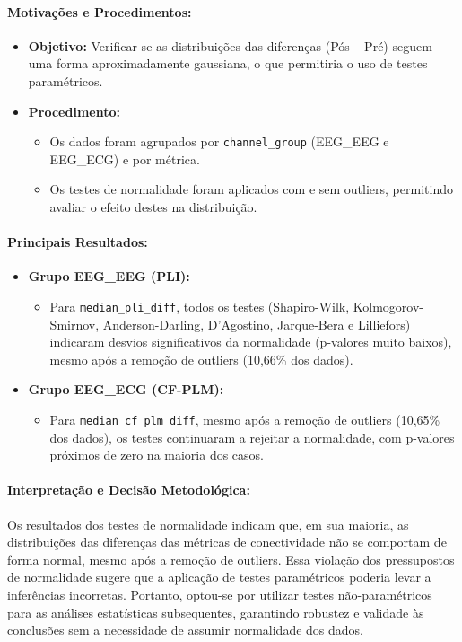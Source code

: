 \paragraph{Motivações e Procedimentos:}

\begin{itemize}
    \item \textbf{Objetivo:} Verificar se as distribuições das diferenças (Pós -- Pré) seguem uma forma aproximadamente gaussiana, o que permitiria o uso de testes paramétricos.
    \item \textbf{Procedimento:} 
    \begin{itemize}
        \item Os dados foram agrupados por \texttt{channel\_group} (EEG\_EEG e EEG\_ECG) e por métrica.
        \item Os testes de normalidade foram aplicados com e sem outliers, permitindo avaliar o efeito destes na distribuição.
    \end{itemize}
\end{itemize}

\paragraph{Principais Resultados:}
\begin{itemize}
    \item \textbf{Grupo EEG\_EEG (PLI):}
    \begin{itemize}
        \item Para \texttt{median\_pli\_diff}, todos os testes (Shapiro-Wilk, Kolmogorov-Smirnov, Anderson-Darling, D'Agostino, Jarque-Bera e Lilliefors) indicaram desvios significativos da normalidade (p-valores muito baixos), mesmo após a remoção de outliers (10,66\% dos dados).
    \end{itemize}
    \item \textbf{Grupo EEG\_ECG (CF-PLM):}
    \begin{itemize}
        \item Para \texttt{median\_cf\_plm\_diff}, mesmo após a remoção de outliers (10,65\% dos dados), os testes continuaram a rejeitar a normalidade, com p-valores próximos de zero na maioria dos casos.
    \end{itemize}
\end{itemize}

\paragraph{Interpretação e Decisão Metodológica:}
Os resultados dos testes de normalidade indicam que, em sua maioria, as distribuições das diferenças das métricas de conectividade não se comportam de forma normal, mesmo após a remoção de outliers. Essa violação dos pressupostos de normalidade sugere que a aplicação de testes paramétricos poderia levar a inferências incorretas. Portanto, optou-se por utilizar testes não-paramétricos para as análises estatísticas subsequentes, garantindo robustez e validade às conclusões sem a necessidade de assumir normalidade dos dados.
